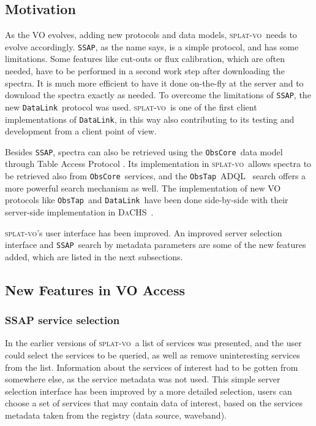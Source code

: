 \documentclass[final,authoryear,5p,times,twocolumn]{elsarticle}
\newcommand{\datalink}{\texttt{DataLink}}
\newcommand{\ssap}{\texttt{SSAP}}
\newcommand{\obstap}{\texttt{ObsTap}}
\newcommand{\obscore}{\texttt{ObsCore}}
\newcommand{\adql}{ADQL}
\newcommand{\splatvo}{\textsc{splat-vo}}
\newcommand{\dachs}{\textsc{DaCHS}}
\begin{document}
\subsection{Motivation}

As the VO evolves, adding new protocols and data models, \splatvo\ needs to
evolve accordingly.  \ssap, as the name says, is a simple protocol, and has
some limitations. Some features like cut-outs or flux calibration, which are
often needed, have to be performed in a second work step after downloading the
spectra. It is much more efficient to have it done on-the-fly at the server
and  to download the spectra exactly as needed. To overcome the limitations of
\ssap, the new \datalink\ protocol \citep{datalink} was used. \splatvo\
is one of the first client implementations of \datalink, in this way
also contributing to its testing and development from a client point of view.

Besides \ssap, spectra can also be retrieved using the \obscore\ data model
through Table Access Protocol  \citep[known as \obstap;][]{obstap}. Its implementation in
\splatvo\ allows spectra to be retrieved also from \obscore\ services, and
the \obstap\ \adql\ \citep{adql} search offers a more powerful search
mechanism as well. The implementation of new VO protocols like \obstap\
and \datalink\ have been done side-by-side with their server-side
implementation in \dachs\ \citep[Data Center Helper Suite;][]{dachs}.

\splatvo's user interface has been improved. An improved server
selection interface and \ssap\ search by metadata parameters are some of
the new features added, which are listed in the next subsections.

\subsection{New Features in VO Access}

\subsubsection{SSAP service selection}

In the earlier versions of \splatvo\ a list of services was presented, and
the user could select the services to be queried, as well as remove
uninteresting services from the list. Information about the services
of interest had to be gotten from somewhere else, as the service
metadata was not used.  This simple server selection interface has
been improved by a more detailed selection, users can choose a set of
services that may contain data of interest, based on the services
metadata taken from the registry (data source, waveband).
\end{document}
